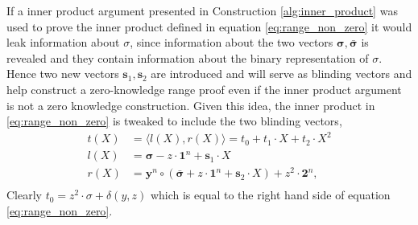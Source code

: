 If a inner product argument presented in Construction \ref{alg:inner_product} was used to prove the inner product defined in equation \eqref{eq:range_non_zero} it would leak information about $\sigma$, since information about the two vectors $\bm{\sigma},\bm{\bar{\sigma}}$ is revealed and they contain information about the binary representation of $\sigma$. Hence two new vectors $\bm{s}_1,\bm{s}_2$ are introduced and will serve as blinding vectors and help construct a zero-knowledge range proof even if the inner product argument is not a zero knowledge construction. Given this idea, the inner product in \eqref{eq:range_non_zero} is tweaked to include the two blinding vectors,
\begin{align}
     t(X) &= \langle  l(X),r(X)\rangle = t_0 + t_1\cdot X + t_2\cdot X^2\\
    l(X) &= \bm{\sigma} -z\cdot \bm{1}^n +\bm{s}_1\cdot X\\
    r(X) &= \bm{y}^n\circ (\bm{\bar{\sigma}} + z \cdot\bm{1}^n + \bm{s}_2\cdot X)+ z^2\cdot\bm{2}^n,\\
    \label{eq:range_zero}
\end{align}
Clearly $t_0 = z^2\cdot\sigma + \delta(y,z)$ which is equal to the right hand side of equation \eqref{eq:range_non_zero}. 